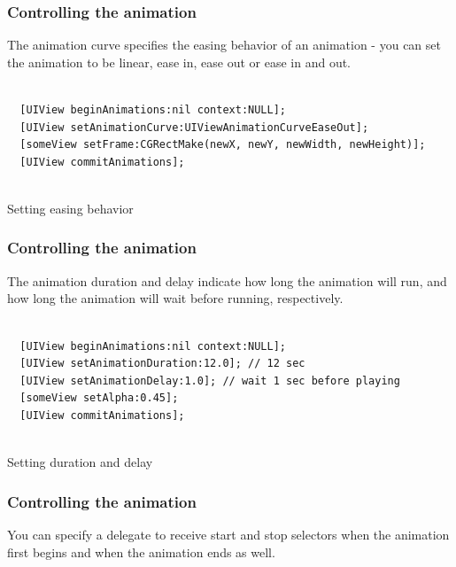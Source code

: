 \documentclass[10pt]{beamer}
\begin{document}
\begin{frame}[fragile]
  \frametitle{Controlling the animation}
  The animation curve specifies the easing behavior of an animation - you can set the animation to be linear, ease in, ease out or ease in and out. \begin{listing}[H]
    \begin{verbatim}
  
  [UIView beginAnimations:nil context:NULL];
  [UIView setAnimationCurve:UIViewAnimationCurveEaseOut];
  [someView setFrame:CGRectMake(newX, newY, newWidth, newHeight)];
  [UIView commitAnimations];
              
  \end{verbatim}
    \caption{Setting easing behavior}
    \label{listing:35}
  \end{listing}

\end{frame}

\begin{frame}[fragile]
  \frametitle{Controlling the animation}
  The animation duration and delay indicate how long the animation will run, and how long the animation will wait before running, respectively. \begin{listing}[H]
    \begin{verbatim}
  
  [UIView beginAnimations:nil context:NULL];
  [UIView setAnimationDuration:12.0]; // 12 sec
  [UIView setAnimationDelay:1.0]; // wait 1 sec before playing
  [someView setAlpha:0.45];
  [UIView commitAnimations];
              
  \end{verbatim}
    \caption{Setting duration and delay}
    \label{listing:36}
  \end{listing}

\end{frame}

\begin{frame}[fragile]
  \frametitle{Controlling the animation}
  You can specify a delegate to receive start and stop selectors when the animation first begins and when the animation ends as well.

\end{frame}
\end{document}
